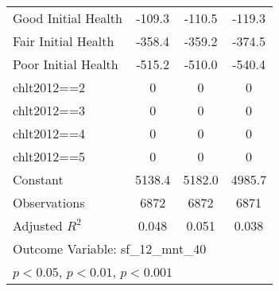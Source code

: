 \begin{table}[tp]
\begin{tabular}{p{4cm}ccc}
Good Initial Health&   -109.3\sym{***}&   -110.5\sym{***}&   -119.3\sym{***}\\
Fair Initial Health&   -358.4\sym{***}&   -359.2\sym{***}&   -374.5\sym{***}\\
Poor Initial Health&   -515.2\sym{***}&   -510.0\sym{***}&   -540.4\sym{***}\\
chlt2012==2     &        0         &        0         &        0         \\
chlt2012==3     &        0         &        0         &        0         \\
chlt2012==4     &        0         &        0         &        0         \\
chlt2012==5     &        0         &        0         &        0         \\
Constant        &   5138.4\sym{***}&   5182.0\sym{***}&   4985.7\sym{***}\\
Observations    &     6872         &     6872         &     6871         \\
Adjusted \(R^{2}\)&    0.048         &    0.051         &    0.038         \\
\multicolumn{4}{l}{\footnotesize Outcome Variable: sf\_12\_mnt\_40}\\
\multicolumn{4}{l}{\footnotesize \sym{*} \(p<0.05\), \sym{**} \(p<0.01\), \sym{***} \(p<0.001\)}\\
\end{tabular}

\end{table}

